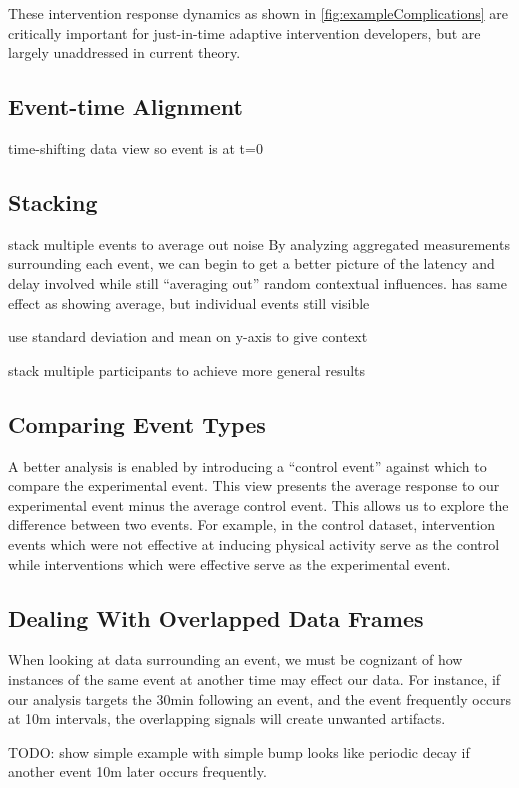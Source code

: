 \documentclass[preprint,journal]{vgtc}       %
\begin{document}
These intervention response dynamics as shown in \ref{fig:exampleComplications} are critically important for just-in-time adaptive intervention developers, but are largely unaddressed in current theory.

\subsection{Event-time Alignment}
time-shifting data view so event is at t=0

\subsection{Stacking}
stack multiple events to average out noise
By analyzing aggregated measurements surrounding each event, we can begin to get a better picture of the latency and delay involved while still “averaging out” random contextual influences.
has same effect as showing average, but individual events still visible

use standard deviation and mean on y-axis to give context

stack multiple participants to achieve more general results



\subsection{Comparing Event Types}
A better analysis is enabled by introducing a “control event” against which to compare the experimental event. 
This view presents the average response to our experimental event minus the average control event. 
This allows us to explore the difference between two events. 
For example, in the control dataset, intervention events which were not effective at inducing physical activity serve as the control while interventions which were effective serve as the experimental event.

\subsection{Dealing With Overlapped Data Frames}
When looking at data surrounding an event, we must be cognizant of how instances of the same event at another time may effect our data. For instance, if our analysis targets the 30min following an event, and the event frequently occurs at 10m intervals, the overlapping signals will create unwanted artifacts.

TODO: show simple example with simple bump looks like periodic decay if another event 10m later occurs frequently. 
\end{document}
